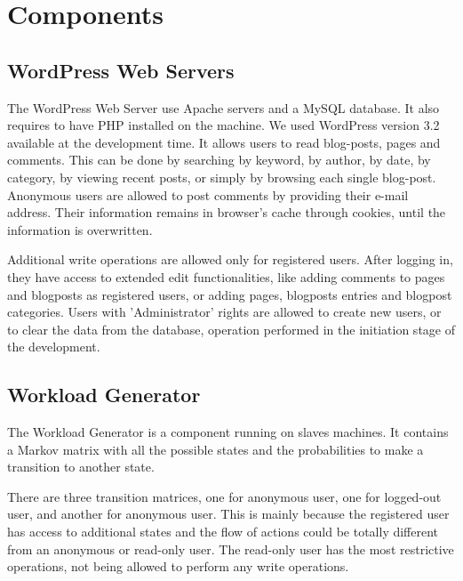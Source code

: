 
\section{Components}
\label{sec:components}

\subsection{WordPress Web Servers}
\label{sub-sec:wordpress-web-servers}

The WordPress Web Server use Apache servers and a MySQL database. It also requires to have PHP installed on the machine. We used WordPress version 3.2 available at the development time. It allows users to read blog-posts, pages and comments. This can be done by searching by keyword, by author, by date, by category, by viewing recent posts, or simply by browsing each single blog-post. Anonymous users are allowed to post comments by providing their e-mail address. Their information remains in browser's cache through cookies, until the information is overwritten.

Additional write operations are allowed only for registered users. After logging in, they have access to extended edit functionalities, like adding comments to pages and blogposts as registered users, or adding pages, blogposts entries and blogpost categories. Users with 'Administrator' rights are allowed to create new users, or to clear the data from the database, operation performed in the initiation stage of the development.

\subsection{Workload Generator}
\label{sub-sec:workload-generator}

The Workload Generator is a component running on slaves machines. It contains a Markov matrix with all the possible states and the probabilities to make a transition to another state. 

There are three transition matrices, one for anonymous user, one for logged-out user, and another for anonymous user. This is mainly because the registered user has access to additional states and the flow of actions could be totally different from an anonymous or read-only user. The read-only user has the most restrictive operations, not being allowed to perform any write operations.

